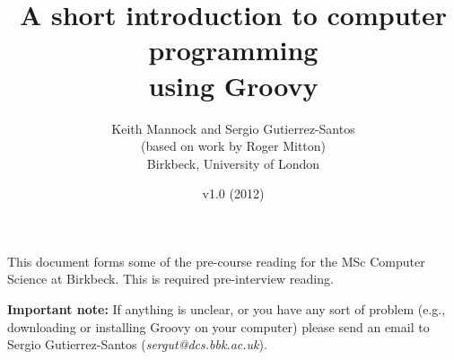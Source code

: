 \documentclass[11pt,a4paper]{article}
\title{A short introduction to computer programming\\using Groovy}
\author{Keith Mannock and Sergio Gutierrez-Santos\\(based on work by
  Roger Mitton)\\
Birkbeck, University of London}
\date{v1.0 (2012)}
\begin{document}
\maketitle



\noindent This document forms some of the pre-course reading for the
MSc Computer Science at Birkbeck. This is required pre-interview reading. 

\textbf{Important note: }If anything is unclear, or you have any sort of problem (e.g.,
downloading or installing Groovy on your computer) please send an
email to Sergio Gutierrez-Santos (\emph{sergut@dcs.bbk.ac.uk}).


\newpage

\newpage

\newpage

\newpage

\newpage

\newpage

\newpage

\end{document}
